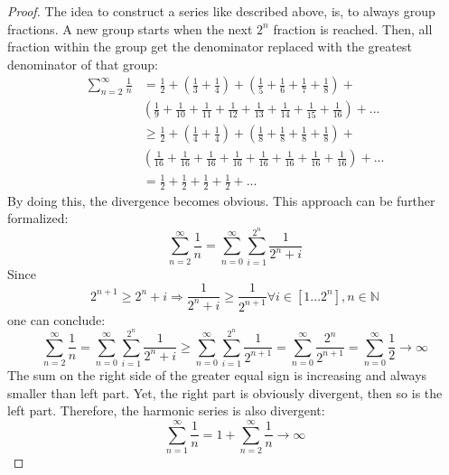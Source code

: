 \begin{proof}
    The idea to construct a series like described above, is, to always group fractions.
    A new group starts when the next $2^n$ fraction is reached.
    Then, all fraction within the group get the denominator replaced with the greatest denominator 
    of that group:
    \begin{equation}
        \begin{split}
            \sum_{n=2}^{\infty}\frac{1}{n} & = 
            \frac{1}{2}
            + \left(\frac{1}{3} + \frac{1}{4}\right) 
            + \left(\frac{1}{5} + \frac{1}{6} + \frac{1}{7} + \frac{1}{8}\right) + \\
            & \left(\frac{1}{9} + \frac{1}{10} + \frac{1}{11} + \frac{1}{12} + \frac{1}{13} + 
            \frac{1}{14} + \frac{1}{15} + \frac{1}{16}\right) + ... \\
            & \ge \frac{1}{2} 
                  + \left(\frac{1}{4} + \frac{1}{4}\right)
                  + \left(\frac{1}{8} + \frac{1}{8} + \frac{1}{8} + \frac{1}{8}\right) + \\
            &     \left(\frac{1}{16} + \frac{1}{16} + \frac{1}{16} + \frac{1}{16} + \frac{1}{16} + 
                          \frac{1}{16} + \frac{1}{16} + \frac{1}{16}\right) + ... \\
            & = \frac{1}{2} + \frac{1}{2} + \frac{1}{2} + \frac{1}{2} + ...
        \end{split}
    \end{equation}
    By doing this, the divergence becomes obvious. This approach can be further formalized:
    \begin{equation}
        \sum_{n=2}^{\infty}\frac{1}{n} = \sum_{n=0}^{\infty}\sum_{i=1}^{2^n}\frac{1}{2^n+i}
    \end{equation}
    Since 
    \begin{equation}
        2^{n+1} \ge 2^n+i \Rightarrow \frac{1}{2^n+i} \ge \frac{1}{2^{n+1}} \forall i \in \left[1...2^n\right], n \in \mathbb{N}
    \end{equation}
    one can conclude:
    \begin{equation}
        \sum_{n=2}^{\infty}\frac{1}{n} = \sum_{n=0}^{\infty}\sum_{i=1}^{2^n}\frac{1}{2^n+i}
            \ge \sum_{n=0}^{\infty}\sum_{i=1}^{2^n}\frac{1}{2^{n+1}}
            = \sum_{n=0}^{\infty}\frac{2^n}{2^{n+1}} = \sum_{n=0}^{\infty}\frac{1}{2} \to \infty
    \end{equation}
    The sum on the right side of the greater equal sign is increasing and always smaller than 
    left part.
    Yet, the right part is obviously divergent, then so is the left part.
    Therefore, the harmonic series is also divergent:
    \begin{equation}
        \sum_{n=1}^{\infty}\frac{1}{n} = 1 + \sum_{n=2}^{\infty}\frac{1}{n} \to \infty
    \end{equation}
\end{proof}